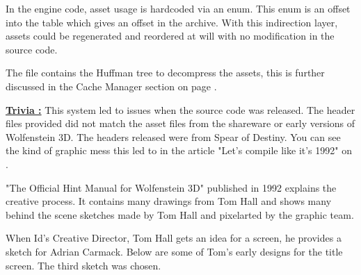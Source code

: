 \documentclass[book.tex]{subfiles}
\begin{document}
 In the engine code, asset usage is hardcoded via an enum. This enum is an offset into the 
  table which gives an offset in the  archive. With this indirection layer, assets could be regenerated and reordered at will with no modification in the source code.\\
 \par
 The  file contains the Huffman tree to decompress the assets, this is further discussed in the Cache Manager section on page \pageref{cache_manager}.\\

 \begin{minipage}{\textwidth}
 \par
 \end{minipage}


 
\pagebreak
\textbf{\underline{Trivia :}} This system led to issues when the source code was released. The  header files provided did not match the asset files from the shareware or early versions of Wolfenstein 3D. The headers released were from Spear of Destiny. You can see the kind of graphic mess this led to in the article "Let's compile like it's 1992" on .\\




\begin{minipage}{0.7\textwidth}
"The Official Hint Manual for Wolfenstein 3D" published in 1992 explains the creative process. It contains many drawings from Tom Hall and shows many behind the scene sketches made by Tom Hall and pixelarted by the graphic team.\\
\par
 \begin{fancyquotes}
When Id's Creative Director, Tom Hall gets an idea for a screen, he provides a sketch for Adrian Carmack. Below are some of Tom's early designs for the title screen. The third sketch was chosen.\\
\end{fancyquotes}
\end{minipage}
\begin{minipage}{0.3\textwidth}
\begin{flushright}
\end{flushright}
\end{minipage}

\noindent
   \begin{figure}[H]
\centering
 \par
 \end{figure}
 \par
   
\end{document}
